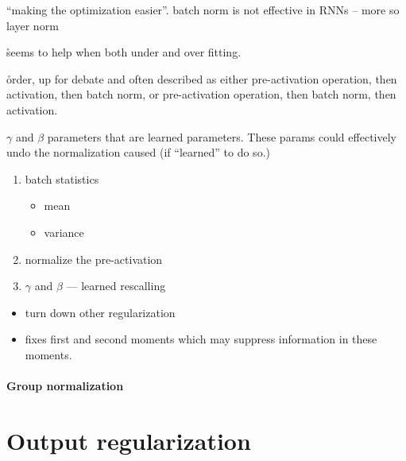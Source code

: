 \r{``making the optimization easier''. batch norm is not effective in RNNs -- more so layer norm}

\r{seems to help when both under and over fitting.}

\r{order, up for debate and often described as either pre-activation operation, then activation, then batch norm, or pre-activation operation, then batch norm, then activation.}

\r{$\gamma$ and $\beta$ parameters that are learned parameters. These params could effectively undo the normalization caused (if ``learned'' to do so.)}


\begin{enumerate}[noitemsep,topsep=0pt]
	\item batch statistics
	\begin{itemize}[noitemsep,topsep=0pt]
		\item mean
		\item variance
	\end{itemize}
	\item normalize the pre-activation
	\item $\gamma$ and $\beta$ --- learned rescalling
\end{enumerate}




\begin{itemize}[noitemsep,topsep=0pt]
	\item turn down other regularization
	\item fixes first and second moments which may suppress information in these moments.
\end{itemize}



\paragraph{Group normalization}



\section{Output regularization}

